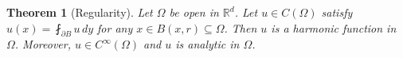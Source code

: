 \documentclass{report}
\theoremstyle{tommy}
\newtheorem{thm}[defn]{Theorem}
\begin{document}
  \begin{thm}[Regularity]
    Let \(\Omega\) be open in \(\mathbb{R}^d\). Let \(u \in C(\Omega)\) satisfy \(u(x) = \fint_{\partial B} u \, dy\) for any \(x \in B(x, r) \subseteq \Omega\). Then \(u\) is a harmonic function in \(\Omega\). Moreover, \(u \in C^\infty(\Omega)\) and \(u\) is analytic in \(\Omega\).
  \end{thm}


\end{document}
